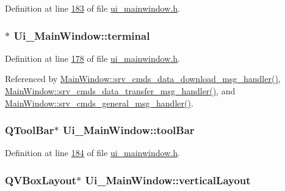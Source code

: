 Definition at line \hyperlink{a00139_source_l00183}{183} of file \hyperlink{a00139_source}{ui\+\_\+mainwindow.\+h}.

\hypertarget{a00080_aae71c46ea4546df5994735dee573b2dd}{
\subsubsection[{terminal}]{$\ast$ Ui\+\_\+\+Main\+Window\+::terminal}}\label{a00080_aae71c46ea4546df5994735dee573b2dd}


Definition at line \hyperlink{a00139_source_l00178}{178} of file \hyperlink{a00139_source}{ui\+\_\+mainwindow.\+h}.



Referenced by \hyperlink{a00136_source_l00588}{Main\+Window\+::srv\+\_\+cmds\+\_\+data\+\_\+download\+\_\+msg\+\_\+handler()}, \hyperlink{a00136_source_l00437}{Main\+Window\+::srv\+\_\+cmds\+\_\+data\+\_\+transfer\+\_\+msg\+\_\+handler()}, and \hyperlink{a00136_source_l00293}{Main\+Window\+::srv\+\_\+cmds\+\_\+general\+\_\+msg\+\_\+handler()}.

\hypertarget{a00080_ab84dc49349f514d7b7d3fe8e78de069b}{
\subsubsection[{tool\+Bar}]{\setlength{\rightskip}{0pt plus 5cm}Q\+Tool\+Bar$\ast$ Ui\+\_\+\+Main\+Window\+::tool\+Bar}}\label{a00080_ab84dc49349f514d7b7d3fe8e78de069b}


Definition at line \hyperlink{a00139_source_l00184}{184} of file \hyperlink{a00139_source}{ui\+\_\+mainwindow.\+h}.

\hypertarget{a00080_aecd96a04789fcfec3f98d80390ad8184}{
\subsubsection[{vertical\+Layout}]{\setlength{\rightskip}{0pt plus 5cm}Q\+V\+Box\+Layout$\ast$ Ui\+\_\+\+Main\+Window\+::vertical\+Layout}}\label{a00080_aecd96a04789fcfec3f98d80390ad8184}


